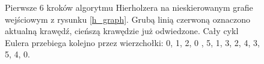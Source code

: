 \documentclass[a4paper, 12pt, twoside, openright]{article}
\begin{document}
\begin{figure}[!p]
		\quad
		\caption[]{Pierwsze 6 kroków algorytmu Hierholzera na nieskierowanym grafie wejściowym z rysunku \ref{h_graph}. Grubą linią czerwoną oznaczono aktualną krawędź, cieńszą krawędzie już odwiedzone. Cały cykl Eulera przebiega kolejno przez wierzchołki: 0, 1, 2, 0 , 5, 1, 3, 2, 4, 3, 5, 4, 0.}
		\label{imgHierAlgoEgz1}
	\end{figure}	
	
\end{document}
